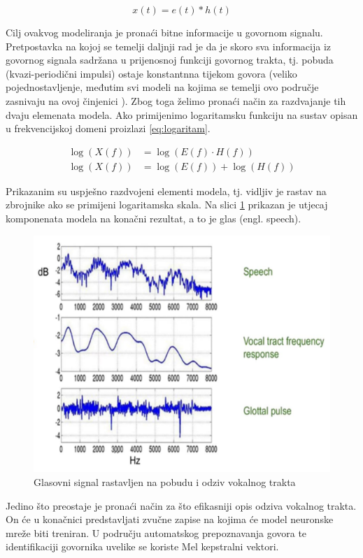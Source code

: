\begin{equation}
    \label{eq:govor_vremenska}
    x(t) = e(t) \ast h(t)
\end{equation}

Cilj ovakvog modeliranja je pronaći bitne informacije u govornom signalu. Pretpostavka na
kojoj se temelji daljnji rad je da je skoro sva informacija iz govornog signala sadržana
u prijenosnoj funkciji govornog trakta, tj. pobuda (kvazi-periodični impulsi) ostaje
konstantnna tijekom govora (veliko pojednostavljenje, međutim svi modeli na kojima
se temelji ovo područje zasnivaju na ovoj činjenici \cite{multiplier, emotion, sidhu2024mfcc}).
Zbog toga želimo pronaći način za 
razdvajanje tih dvaju elemenata modela. Ako primijenimo logaritamsku funkciju na
sustav opisan u frekvencijskoj domeni proizlazi \ref{eq:logaritam}.

\begin{equation}
    \label{eq:logaritam}
    \begin{aligned}
        \log(X(f)) &= \log(E(f) \cdot H(f)) \\
        \log(X(f)) &= \log(E(f)) + \log(H(f))
    \end{aligned}
\end{equation}

Prikazanim su uspješno razdvojeni elementi modela, tj. vidljiv je rastav na zbrojnike
ako se primijeni logaritamska skala. Na slici \ref{pic:rastav} prikazan je utjecaj
komponenata modela na konačni rezultat, a to je glas (engl. speech). 

\begin{figure}[htb]
    \centering
    \includegraphics[width=0.6\linewidth]{Chapters/struktura_sustava/generiranje_znacajki/log.png} 
    \caption{Glasovni signal rastavljen na pobudu i odziv vokalnog trakta \cite{sidhu2024mfcc}}
    \label{pic:rastav}
\end{figure}

Jedino što preostaje je pronaći način za što efikasniji opis odziva vokalnog trakta. On će
u konačnici predstavljati zvučne zapise na kojima će model neuronske mreže biti treniran.
U području automatskog prepoznavanja govora te identifikaciji govornika uvelike se koriste
Mel kepstralni vektori.


